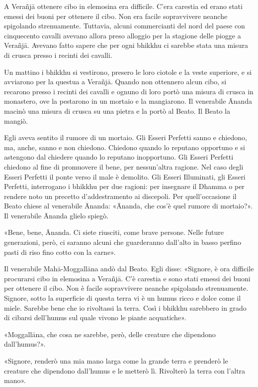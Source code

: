  A Verañjā ottenere cibo in elemosina era difficile. C’era
carestia ed erano stati emessi dei buoni per ottenere il cibo. Non era facile
sopravvivere neanche spigolando strenuamente. Tuttavia, alcuni commercianti del
nord del paese con cinquecento cavalli avevano allora preso alloggio per la
stagione delle piogge a Verañjā. Avevano fatto sapere che per ogni bhikkhu ci
sarebbe stata una misura di crusca presso i recinti dei cavalli.

Un mattino i bhikkhu si vestirono, presero le loro ciotole e la veste superiore,
e si avviarono per la questua a Verañjā. Quando non ottennero alcun cibo, si
recarono presso i recinti dei cavalli e ognuno di loro portò una misura di
crusca in monastero, ove la pestarono in un mortaio e la mangiarono. Il
venerabile Ānanda macinò una misura di crusca su una pietra e la portò al Beato.
Il Beato la mangiò.

Egli aveva sentito il rumore di un mortaio. Gli Esseri Perfetti sanno e
chiedono, ma, anche, sanno e non chiedono. Chiedono quando lo reputano opportuno
e si astengono dal chiedere quando lo reputano inopportuno. Gli Esseri Perfetti
chiedono al fine di promuovere il bene, per nessun’altra ragione. Nel caso degli
Esseri Perfetti il ponte verso il male è demolito. Gli Esseri Illuminati, gli
Esseri Perfetti, interrogano i bhikkhu per due ragioni: per insegnare il Dhamma
o per rendere noto un precetto d’addestramento ai discepoli. Per quell’occasione
il Beato chiese al venerabile Ānanda: «Ānanda, che cos’è quel rumore di
mortaio?». Il venerabile Ānanda glielo spiegò.

«Bene, bene, Ānanda. Ci siete riusciti, come brave persone. Nelle future
generazioni, però, ci saranno alcuni che guarderanno dall’alto in basso perfino
pasti di riso fino cotto con la carne».

Il venerabile Mahā-Moggallāna andò dal Beato. Egli disse: «Signore, è ora
difficile procurarsi cibo in elemosina a Verañjā. C’è carestia e sono stati
emessi dei buoni per ottenere il cibo. Non è facile sopravvivere neanche
spigolando strenuamente. Signore, sotto la superficie di questa terra vi è un
humus ricco e dolce come il miele. Sarebbe bene che io rivoltassi la terra. Così
i bhikkhu sarebbero in grado di cibarsi dell’humus sul quale vivono le piante
acquatiche».

«Moggallāna, che cosa ne sarebbe, però, delle creature che dipendono
dall’humus?».

«Signore, renderò una mia mano larga come la grande terra e prenderò le creature
che dipendono dall’humus e le metterò lì. Rivolterò la terra con l’altra mano».

